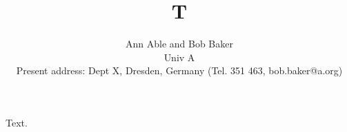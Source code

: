 \documentclass{article}
\begin{document}
\title{T}
\author{Ann Able and Bob Baker\\ Univ A\\ Present address: Dept X, Dresden, Germany (Tel. 351 463, bob.baker@a.org)}
\maketitle
Text.
\end{document}
